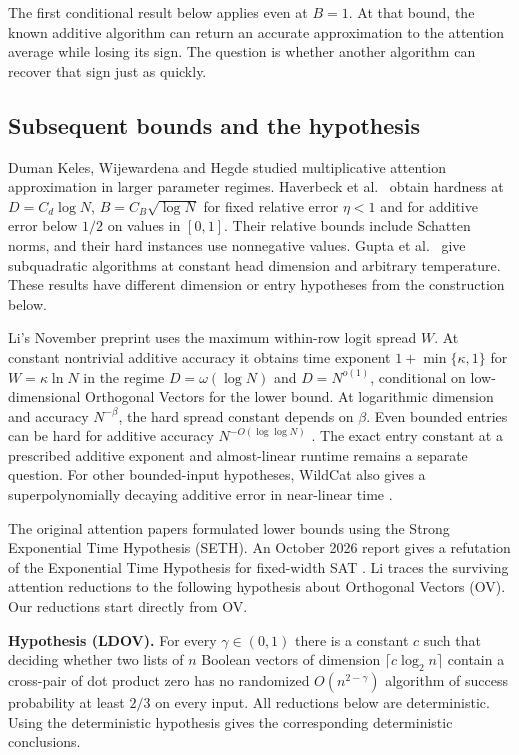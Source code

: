 \documentclass[11pt,letterpaper]{article}
\newcommand{\result}[1]{\smallskip\textbf{#1}\enspace}
\begin{document}
The first conditional result below applies even at $B=1$. At that bound, the known additive algorithm can return an accurate approximation to the attention average while losing its sign. The question is whether another algorithm can recover that sign just as quickly.
\newpage

\subsection*{Subsequent bounds and the hypothesis}
Duman Keles, Wijewardena and Hegde \cite{keles} studied multiplicative attention approximation in larger parameter regimes. Haverbeck et al.\ \cite[Theorem 3.7 and Table 1]{hav} obtain hardness at $D=C_d\log N$, $B=C_B\sqrt{\log N}$ for fixed relative error $\eta<1$ and for additive error below $1/2$ on values in $[0,1]$. Their relative bounds include Schatten norms, and their hard instances use nonnegative values. Gupta et al.\ \cite{gupta} give subquadratic algorithms at constant head dimension and arbitrary temperature. These results have different dimension or entry hypotheses from the construction below.

Li's November preprint \cite[Corollaries 3.7, 4.2 and 4.5]{li} uses the maximum within-row logit spread $W$. At constant nontrivial additive accuracy it obtains time exponent $1+\min\{\kappa,1\}$ for $W=\kappa\ln N$ in the regime $D=\omega(\log N)$ and $D=N^{o(1)}$, conditional on low-dimensional Orthogonal Vectors for the lower bound. At logarithmic dimension and accuracy $N^{-\beta}$, the hard spread constant depends on $\beta$. Even bounded entries can be hard for additive accuracy $N^{-O(\log\log N)}$ \cite[Remark 4.3]{li}. The exact entry constant at a prescribed additive exponent and almost-linear runtime remains a separate question. For other bounded-input hypotheses, WildCat also gives a superpolynomially decaying additive error in near-linear time \cite{wildcat}.

The original attention papers formulated lower bounds using the Strong Exponential Time Hypothesis (SETH). An October 2026 report gives a refutation of the Exponential Time Hypothesis for fixed-width SAT \cite{eth}. Li \cite[Section 2.2]{li} traces the surviving attention reductions to the following hypothesis about Orthogonal Vectors (OV). Our reductions start directly from OV.

\result{Hypothesis (LDOV).} For every $\gamma\in(0,1)$ there is a constant $c$ such that deciding whether two lists of $n$ Boolean vectors of dimension $\lceil c\log_2 n\rceil$ contain a cross-pair of dot product zero has no randomized $O(n^{2-\gamma})$ algorithm of success probability at least $2/3$ on every input. All reductions below are deterministic. Using the deterministic hypothesis gives the corresponding deterministic conclusions.
\end{document}
